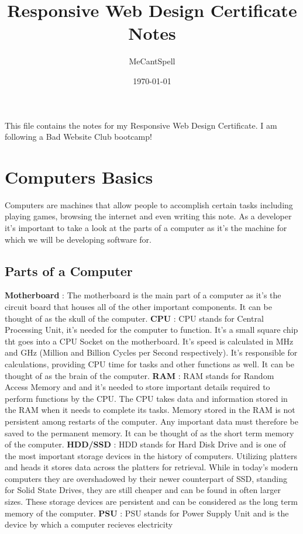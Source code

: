 \documentclass[11pt]{article}
\author{MeCantSpell}
\date{\today}
\title{Responsive Web Design Certificate Notes}
\begin{document}
\maketitle
\tableofcontents

This file contains the notes for my Responsive Web Design Certificate. I am following a Bad Website
Club bootcamp!
\section{Computers Basics}
\label{sec:orgd8acff2}
Computers are machines that allow people to accomplish certain tasks including playing games,
browsing the internet and even writing this note.
As a developer it's important to take a look at the parts of a computer as it's the machine for
which we will be developing software for.
\subsection{Parts of a Computer}
\label{sec:orge992b1f}
\textbf{Motherboard} : The motherboard is the main part of a computer as it's the circuit board that houses
all of the other important components. It can be thought of as the skull of the computer.
\textbf{CPU} : CPU stands for Central Processing Unit, it's needed for
the computer to function. It's a small square chip tht goes into a CPU Socket on the
motherboard. It's speed is calculated in MHz and GHz (Million and Billion Cycles per Second
respectively). It's responsible for calculations, providing CPU time for tasks and other functions
as well. It can be thought of as the brain of the computer.
\textbf{RAM} : RAM stands for Random Access Memory and and it's needed to store important details required
to perform functions by the CPU. The CPU takes data and information stored in the RAM when it needs
to complete its tasks. Memory stored in the RAM is not persistent among
restarts of the computer. Any important data must therefore be saved to the permanent memory. It can
be thought of as the short term memory of the computer.
\textbf{HDD/SSD} : HDD stands for Hard Disk Drive and is one of the most important storage devices in the
history of computers. Utilizing platters and heads it stores data across the platters for
retrieval. While in today's modern computers they are overshadowed by their newer counterpart of
SSD, standing for Solid State Drives, they are still cheaper and can be found in often larger
sizes. These storage devices are persistent and can be considered as the long term memory of the
computer.
\textbf{PSU} : PSU stands for Power Supply Unit and is the device by which a computer recieves electricity
\end{document}
